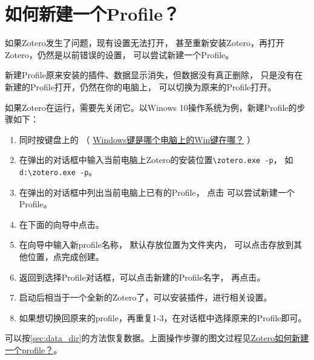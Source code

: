 \documentclass[theorem=false,mathfont=none,openany,sub3section]{easybook}
\begin{document}
{\section{如何新建一个Profile？} \label{sec:creatProfile}
如果Zotero发生了问题，现有设置无法打开，
甚至重新安装Zotero，再打开Zotero，仍然是以前错误的设置，
可以尝试新建一个Profile。
\begin{note}
	新建Profile原来安装的插件、数据显示消失，但数据没有真正删除，
	只是没有在新建的Profile打开，仍然在你的电脑上，
	可以切换为原来的Profile打开。
\end{note}
如果Zotero在运行，需要先关闭它。以Winows 10操作系统为例，新建Profile的步骤如下：
\begin{enumerate}
	\item 同时按键盘上的
	（
	\href{https://product.pconline.com.cn/itbk/software/dnwt/1601/7475121.html}{Windows键是哪个电脑上的Win键在哪？} ）
	\item 在弹出的对话框中输入当前电脑上Zotero的安装位置\verb|\zotero.exe -p|，
	如\verb|d:\zotero.exe -p|。
	\item 在弹出的对话框中列出当前电脑上已有的Profile，
	点击 可以尝试新建一个Profile。
	\item 在下面的向导中点击。
	\item 在向导中输入新profile名称，
	默认存放位置为文件夹内，
	可以点击存放到其他位置，点完成创建。
	\item 返回到选择Profile对话框，可以点击新建的Profile名字，
	再点击。
	\item 启动后相当于一个全新的Zotero了，可以安装插件，进行相关设置。
	\item 如果想切换回原来的profile，再重复1-3，在对话框中选择原来的Profile即可。
\end{enumerate}
可以按\cref{sec:data_dir}的方法恢复数据。上面操作步骤的图文过程见\href{https://zhuanlan.zhihu.com/p/404906012}{Zotero如何新建一个profile？}。

}
\end{document}
